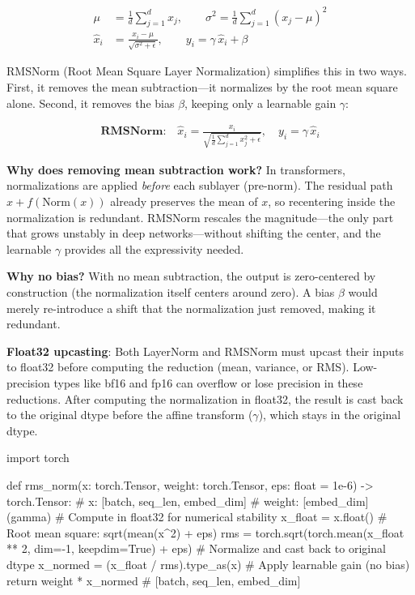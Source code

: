 \begin{align*}
  \mu &= \frac{1}{d}\sum_{j=1}^{d} x_j, \qquad
  \sigma^2 = \frac{1}{d}\sum_{j=1}^{d}(x_j - \mu)^2 \\[6pt]
  \hat{x}_i &= \frac{x_i - \mu}{\sqrt{\sigma^2 + \epsilon}}, \qquad
  y_i = \gamma\,\hat{x}_i + \beta
\end{align*}

RMSNorm (Root Mean Square Layer Normalization) simplifies this in two ways.
First, it removes the mean subtraction---it normalizes by the root mean square
alone. Second, it removes the bias $\beta$, keeping only a learnable gain
$\gamma$:

\begin{align*}
  \textbf{RMSNorm:} \quad \hat{x}_i = \frac{x_i}{\sqrt{\frac{1}{d}\sum_{j=1}^{d} x_j^2 + \epsilon}}, \quad y_i = \gamma\,\hat{x}_i
\end{align*}

\begin{keyconcept}
  \textbf{Why does removing mean subtraction work?} In transformers,
  normalizations are applied \emph{before} each sublayer (pre-norm). The
  residual path $x + f(\text{Norm}(x))$ already preserves the mean of $x$,
  so recentering inside the normalization is redundant. RMSNorm rescales
  the magnitude---the only part that grows unstably in deep
  networks---without shifting the center, and the learnable $\gamma$ provides
  all the expressivity needed.

  \textbf{Why no bias?} With no mean subtraction, the output is
  zero-centered by construction (the normalization itself centers around
  zero). A bias $\beta$ would merely re-introduce a shift that the
  normalization just removed, making it redundant.
\end{keyconcept}

\begin{keyconcept}
  \textbf{Float32 upcasting}: Both LayerNorm and RMSNorm must upcast their
  inputs to float32 before computing the reduction (mean, variance, or RMS).
  Low-precision types like bf16 and fp16 can overflow or lose precision in
  these reductions. After computing the normalization in float32, the result
  is cast back to the original dtype before the affine transform ($\gamma$),
  which stays in the original dtype.
\end{keyconcept}

\begin{pseudocode}
import torch

def rms_norm(x: torch.Tensor, weight: torch.Tensor, eps: float = 1e-6) -> torch.Tensor:
    # x: [batch, seq_len, embed_dim]
    # weight: [embed_dim]  (gamma)
    # Compute in float32 for numerical stability
    x_float = x.float()
    # Root mean square: sqrt(mean(x^2) + eps)
    rms = torch.sqrt(torch.mean(x_float ** 2, dim=-1, keepdim=True) + eps)
    # Normalize and cast back to original dtype
    x_normed = (x_float / rms).type_as(x)
    # Apply learnable gain (no bias)
    return weight * x_normed  # [batch, seq_len, embed_dim]
\end{pseudocode}

